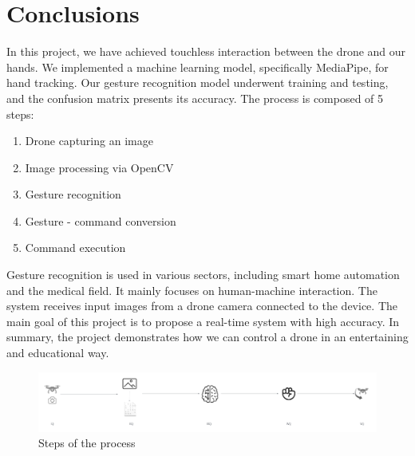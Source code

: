 \chapter{Conclusions}
In this project, we have achieved touchless interaction between the drone and our hands. We implemented a machine learning model, specifically MediaPipe, for hand tracking. Our gesture recognition model underwent training and testing, and the confusion matrix presents its accuracy. The process is composed of 5 steps: 
\begin{enumerate}[label=\Roman*.]
    \item Drone capturing an image
    \item Image processing via OpenCV
    \item Gesture recognition
    \item Gesture - command conversion
    \item Command execution
  
\end{enumerate}
 Gesture recognition is used in various sectors, including smart home automation and the medical field. It mainly focuses on human-machine interaction. The system receives input images from a drone camera connected to the device. The main goal of this project is to propose a real-time system with high accuracy. 
In summary, the project demonstrates how we can control a drone in an entertaining and educational way. 
\begin{figure}
	\centering
	\includegraphics[width = \textwidth]{images/steps.pdf}
	\caption{Steps of the process}
	\label{fig:conclusion}
\end{figure}
\clearpage